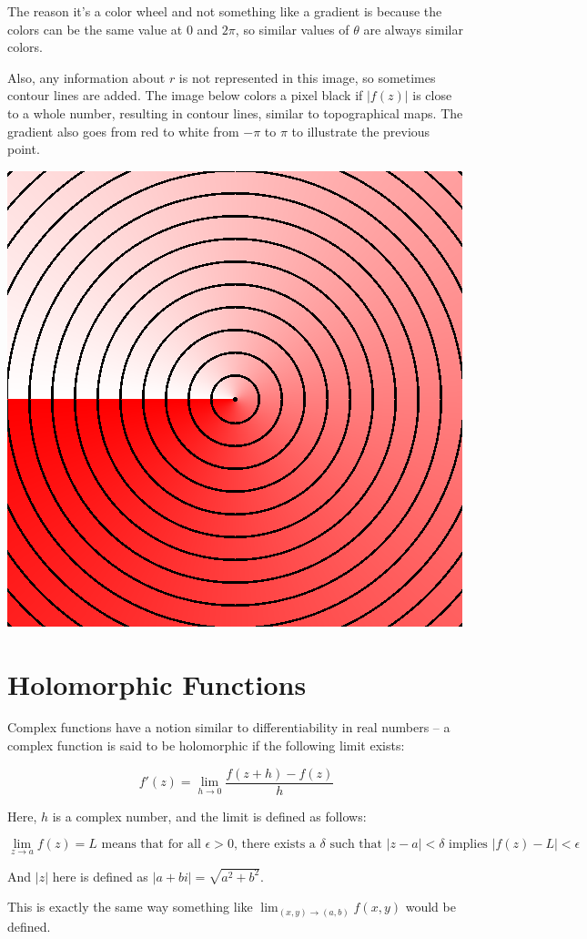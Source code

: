 \documentclass[xhtml, mathjax]{article}
\begin{document}
  The reason it's a color wheel and not something like a gradient is because the
  colors can be the same value at $0$ and $2\pi$, so similar values of $\theta$
  are always similar colors.

  Also, any information about $r$ is not represented in this image, so sometimes
  contour lines are added. The image below colors a pixel black if $|f(z)|$ is
  close to a whole number, resulting in contour lines, similar to topographical
  maps. The gradient also goes from red to white from $-\pi$ to $\pi$ to illustrate
  the previous point.

  \begin{center}
    \includegraphics{z_contour.gif}
  \end{center}


  \section{Holomorphic Functions}

  Complex functions have a notion similar to differentiability in real numbers
  -- a complex function is said to be holomorphic if the following limit exists:

  \[f'(z) = \lim_{h \to 0} \frac{f(z+h) - f(z)}{h}\]

  Here, $h$ is a complex number, and the limit is defined as follows:

  \[\lim_{z \to a}f(z) = L \text{ means that for all } \epsilon > 0 \text{,
  there exists a } \delta \text{ such that } |z - a| < \delta \text{ implies }
  |f(z) - L| < \epsilon\]

  And $|z|$ here is defined as $|a+bi| = \sqrt{a^2+b^2}$.

  This is exactly the same way something like $\lim_{(x,y) \to (a,b)} f(x,y)$
  would be defined.
\end{document}
